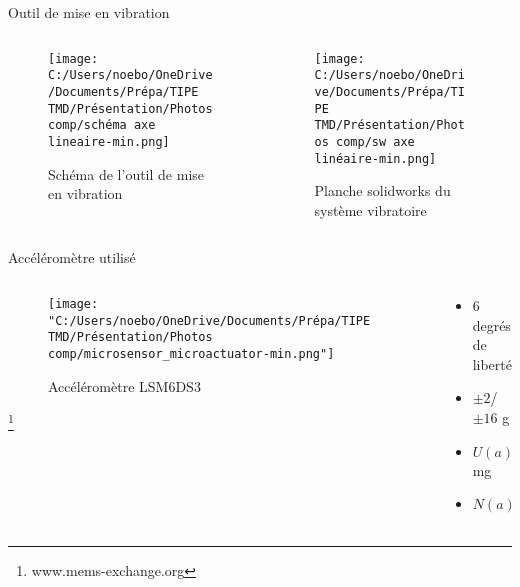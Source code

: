 \documentclass{beamer}
\begin{document}
  

\begin{frame}{Outil de mise en vibration}

	\begin{columns}
		\begin{column}{0.5\textwidth}
			\begin{figure}
				\texttt{[image: C:/Users/noebo/OneDrive/Documents/Prépa/TIPE TMD/Présentation/Photos comp/schéma axe lineaire-min.png]}
				\caption{Schéma de l'outil de mise en vibration}
			\end{figure}
		\end{column}
		\begin{column}{0.5\textwidth}
			\begin{figure}
				\texttt{[image: C:/Users/noebo/OneDrive/Documents/Prépa/TIPE TMD/Présentation/Photos comp/sw axe linéaire-min.png]}
				\caption{Planche solidworks du système vibratoire}
			\end{figure}
		\end{column}
	\end{columns}
\end{frame}


	\begin{frame}{Accéléromètre utilisé}
	\begin{columns}
		\begin{column}{0.5\textwidth}
			\begin{figure}
				\texttt{[image: "C:/Users/noebo/OneDrive/Documents/Prépa/TIPE TMD/Présentation/Photos comp/microsensor\_microactuator-min.png"]}
				\caption{Accéléromètre LSM6DS3}
			\end{figure}
		\footnote{www.mems-exchange.org}
		\end{column}
		\begin{column}{0.5\textwidth}
			\begin{itemize}
				\item 6 degrés de liberté 
				\item $\pm 2$/$\pm 16$ g
				\item $U(a)=0.122$ mg 
				\item $N(a) = 90 \frac{\mu g}{\sqrt{Hz}}$ 
			\end{itemize}
		\end{column}
		
	\end{columns}
	\end{frame}
\end{document}
